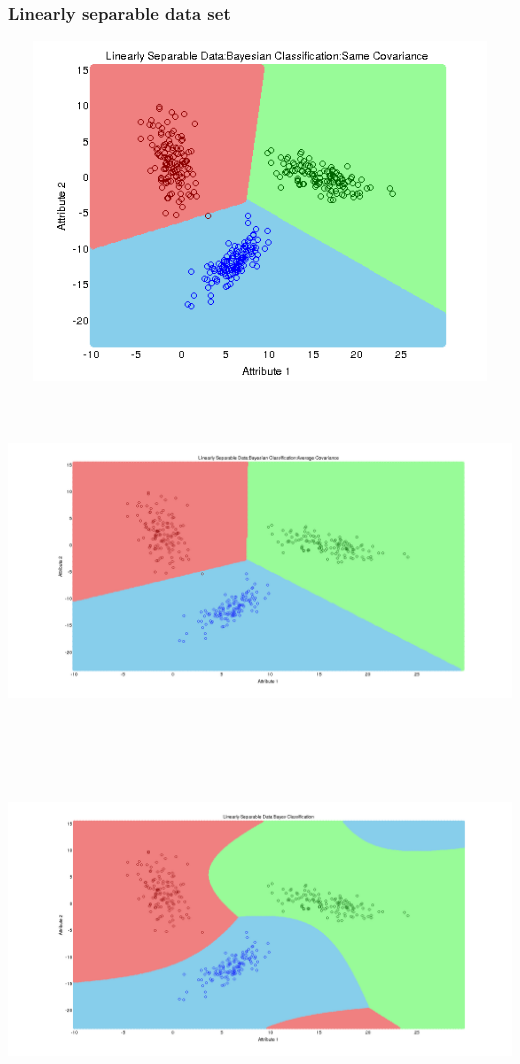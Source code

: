 \documentclass[a4paper]{article}
\begin{document}
		\subsubsection{Linearly separable data set}
		\centerline{\includegraphics[width=160mm,height=90mm]{plots/bayes/ls/same_cov.png}}
 		\centerline{\includegraphics[width=160mm,height=90mm]{plots/bayes/ls/avg_cov.png}}
 		\centerline{\includegraphics[width=160mm,height=90mm]{plots/bayes/ls/diff_cov.png}}
\end{document}
